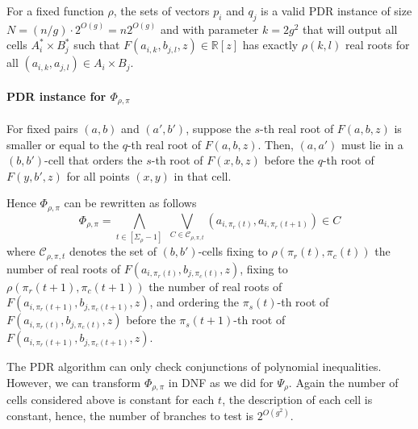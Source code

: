 For a fixed function $\rho$,
the sets of vectors $p_i$ and $q_j$ is a valid PDR instance
of size $N = (n/g) \cdot 2^{O(g)} = n2^{O(g)}$ and with parameter $k = 2g^2$
that will
output all cells $A^*_i \times B^*_j$ such that $F(a_{i,k},b_{j,l},z) \in
\mathbb{R}[z]$ has exactly $\rho(k,l)$ real roots for all $(a_{i,k},a_{j,l}) \in A_i
\times B_j$.

\paragraph{PDR instance for $\Phi_{\rho,\pi}$}

For fixed pairs $(a,b)$ and $(a',b')$, suppose the $s$-th real root of
$F(a,b,z)$ is smaller or equal to the $q$-th real root of $F(a,b,z)$. Then,
$(a,a')$ must lie in a $(b,b')$-cell that orders the $s$-th root of $F(x,b,z)$
before the $q$-th root of $F(y,b',z)$ for all points $(x,y)$ in that cell.

Hence $\Phi_{\rho,\pi}$ can be rewritten as follows
\begin{displaymath}
	\Phi_{\rho,\pi} =
	\bigwedge_{t\in[\Sigma_\rho-1]}\,\,
	\bigvee_{C \in \mathcal{C}_{\rho,\pi,t}}
	( a_{i,\pi_r(t)}, a_{i,\pi_r(t+1)} ) \in C
\end{displaymath}
where $\mathcal{C}_{\rho,\pi,t}$ denotes the set of $(b,b')$-cells
fixing to $\rho(\pi_r(t),\pi_c(t))$ the number of real roots of
$F(a_{i,\pi_r(t)},b_{j,\pi_c(t)},z)$,
fixing to $\rho(\pi_r(t+1), \pi_c(t+1))$
the number of real roots of $F(a_{i,\pi_r(t+1)},b_{j,\pi_c(t+1)},z)$,
and ordering the $\pi_s(t)$-th root of $F(a_{i,\pi_r(t)},b_{j,\pi_c(t)},z)$
before the $\pi_s(t+1)$-th root of $F(a_{i,\pi_r(t+1)},b_{j,\pi_c(t+1)},z)$.

The PDR algorithm can only check conjunctions of polynomial inequalities.
However, we can transform $\Phi_{\rho,\pi}$ in DNF as we did for $\Psi_{\rho}$.
Again the number of cells considered above is constant for each $t$, the
description of each cell is constant, hence, the number of branches to test is
$2^{O(g^2)}$.


